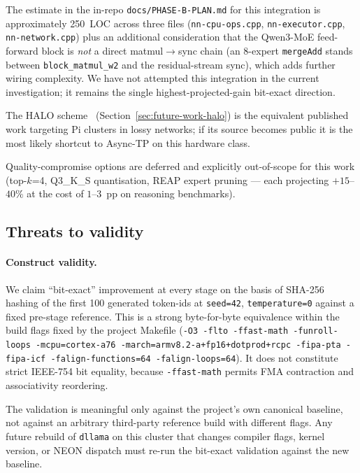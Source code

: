 \documentclass[10pt,a4paper]{article}
\begin{document}
The estimate in the in-repo \texttt{docs/PHASE-B-PLAN.md} for this integration is approximately 250~LOC across three files (\texttt{nn-cpu-ops.cpp}, \texttt{nn-executor.cpp}, \texttt{nn-network.cpp}) plus an additional consideration that the Qwen3-MoE feed-forward block is \emph{not} a direct matmul$\to$sync chain (an 8-expert \texttt{mergeAdd} stands between \texttt{block\_matmul\_w2} and the residual-stream sync), which adds further wiring complexity. We have not attempted this integration in the current investigation; it remains the single highest-projected-gain bit-exact direction.

The HALO scheme~\cite{halo2026} (Section~\ref{sec:future-work-halo}) is the equivalent published work targeting Pi clusters in lossy networks; if its source becomes public it is the most likely shortcut to Async-TP on this hardware class.

Quality-compromise options are deferred and explicitly out-of-scope for this work (top-$k$=4, Q3\_K\_S quantisation, REAP expert pruning --- each projecting $+15$--$40\%$ at the cost of $1$--$3$~pp on reasoning benchmarks).

\subsection{Threats to validity}
\label{sec:threats}

\paragraph{Construct validity.}
We claim ``bit-exact'' improvement at every stage on the basis of SHA-256 hashing of the first 100 generated token-ids at \texttt{seed=42}, \texttt{temperature=0} against a fixed pre-stage reference. This is a strong byte-for-byte equivalence within the build flags fixed by the project Makefile (\texttt{-O3 -flto -ffast-math -funroll-loops -mcpu=cortex-a76 -march=armv8.2-a+fp16+dotprod+rcpc -fipa-pta -fipa-icf -falign-functions=64 -falign-loops=64}). It does not constitute strict IEEE-754 bit equality, because \texttt{-ffast-math} permits FMA contraction and associativity reordering.

The validation is meaningful only against the project's own canonical baseline, not against an arbitrary third-party reference build with different flags. Any future rebuild of \texttt{dllama} on this cluster that changes compiler flags, kernel version, or NEON dispatch must re-run the bit-exact validation against the new baseline.
\end{document}
